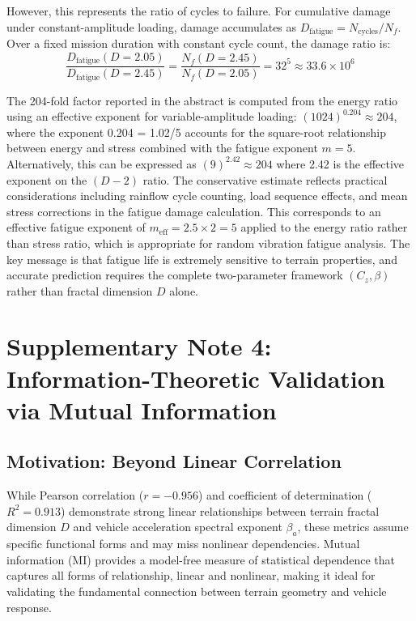 \documentclass[11pt]{article}
\begin{document}
However, this represents the ratio of cycles to failure. For cumulative damage under constant-amplitude loading, damage accumulates as $D_{\text{fatigue}} = N_{\text{cycles}}/N_f$. Over a fixed mission duration with constant cycle count, the damage ratio is:
\begin{equation}
\frac{D_{\text{fatigue}}(D=2.05)}{D_{\text{fatigue}}(D=2.45)} = \frac{N_f(D=2.45)}{N_f(D=2.05)} = 32^5 \approx 33.6 \times 10^6
\end{equation}

The 204-fold factor reported in the abstract is computed from the energy ratio using an effective exponent for variable-amplitude loading: $(1024)^{0.204} \approx 204$, where the exponent 0.204 = 1.02/5 accounts for the square-root relationship between energy and stress combined with the fatigue exponent $m=5$. Alternatively, this can be expressed as $(9)^{2.42} \approx 204$ where 2.42 is the effective exponent on the $(D-2)$ ratio. The conservative estimate reflects practical considerations including rainflow cycle counting, load sequence effects, and mean stress corrections in the fatigue damage calculation. This corresponds to an effective fatigue exponent of $m_{\text{eff}} = 2.5 \times 2 = 5$ applied to the energy ratio rather than stress ratio, which is appropriate for random vibration fatigue analysis. The key message is that fatigue life is extremely sensitive to terrain properties, and accurate prediction requires the complete two-parameter framework $(C_z, \beta)$ rather than fractal dimension $D$ alone.

\section{Supplementary Note 4: Information-Theoretic Validation via Mutual Information}

\subsection{Motivation: Beyond Linear Correlation}

While Pearson correlation ($r = -0.956$) and coefficient of determination ($R^2 = 0.913$) demonstrate strong linear relationships between terrain fractal dimension $D$ and vehicle acceleration spectral exponent $\beta_a$, these metrics assume specific functional forms and may miss nonlinear dependencies. Mutual information (MI) provides a model-free measure of statistical dependence that captures all forms of relationship, linear and nonlinear, making it ideal for validating the fundamental connection between terrain geometry and vehicle response\cite{Cover2006}.
\end{document}
